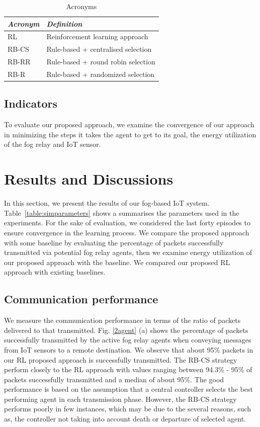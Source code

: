 \documentclass[journal]{IEEEtran}
\begin{document}
\begin{table}
\small
\centering
\caption{Acronyms}
\label{table:Baseline}
\begin{tabular}{ll}
  \hline
 \textit{Acronym} & \textit{Definition} \\
  \hline \hline

   RL & Reinforcement learning approach\\
   RB-CS & Rule-based + centralised selection\\
   RB-RR & Rule-based + round robin selection\\
   RB-R & Rule-based + randomized selection\\

   \hline \hline
 \end{tabular}
 \end{table}

\subsection{Indicators}
To evaluate our proposed approach, we examine the convergence of our approach in minimizing the steps it takes the agent to get to its goal, the energy utilization of the fog relay and IoT sensor.



\section{Results and Discussions}
In this section, we present the results of our fog-based IoT system. Table~\ref{table:simparameters} shows a summarises the parameters used in the experiments. For the sake of evaluation, we considered the last forty episodes to ensure convergence in the learning process. We compare the proposed approach with some baseline by evaluating the percentage of packets successfully transmitted via potential fog relay agents, then we examine energy utilization of our proposed approach with the baseline. We compared our proposed RL approach with existing baselines.

\subsection{Communication performance}
We measure the communication performance in terms of the ratio of packets delivered to that transmitted. Fig. \ref{2agent} (a) shows the percentage of packets successfully transmitted by the active fog relay agents when conveying messages from IoT sensors to a remote destination. We observe that about 95\% packets in our RL proposed approach is successfully transmitted. The RB-CS strategy perform closely to the RL approach with values ranging between 94.3\% - 95\% of packets successfully transmitted and a median of about 95\%. The good performance is based on the assumption that a central controller selects the best performing agent in each transmission phase. However, the RB-CS strategy performs poorly in few instances, which may be due to the several reasons, such as, the controller not taking into account death or departure of selected agent.
\end{document}
